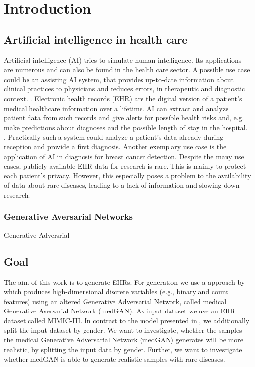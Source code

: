 \documentclass[11pt, a4paper]{book}
\begin{document}





\chapter{Introduction}

\section{Artificial intelligence in health care}
Artificial intelligence (AI) tries to simulate human intelligence. Its applications are numerous and can also be found in the health care sector. A possible use case could be an assisting AI system, that provides up-to-date information about clinical practices to physicians and reduces errors, in therapeutic and diagnostic context. \cite{jiang2017artificial}. Electronic health records (EHR) are the digital version of a patient's medical healthcare information over a lifetime. AI can extract and analyze patient data from such records and give alerts for possible health risks and, e.g. make predictions about diagnoses and the possible length of stay in the hospital. \cite{neill2013using}. Practically such a system could analyze a patient's data already during reception and provide a first diagnosis. Another exemplary use case is the application of AI in diagnosis for breast cancer detection. \cite{ubeyli2007implementing} Despite the many use cases, publicly available EHR data for research is rare. This is mainly to protect each patient's privacy. However, this especially poses a problem to the availability of data about rare diseases, leading to a lack of information and slowing down research. \cite{bremond2015contribution}

\subsection{Generative Aversarial Networks}
Generative Adversrial 

\section{Goal}
The aim of this work is to generate EHRs. For generation we use a approach by \cite{Choi2017} which produces high-dimensional discrete variables (e.g., binary and count features) using an altered Generative Adversarial Network, called medical Generative Aversarial Network (medGAN). As input dataset we use an EHR dataset called MIMIC-III. In contrast to the model presented in \citep{Choi2017}, we additionally split the input dataset by gender.
 We want to investigate, whether the samples the medical Generative Adversarial Network (medGAN) generates will be more realistic, by splitting the input data by gender. Further, we want to investigate whether medGAN is able to generate realistic samples with rare diseases.
 
\end{document}

